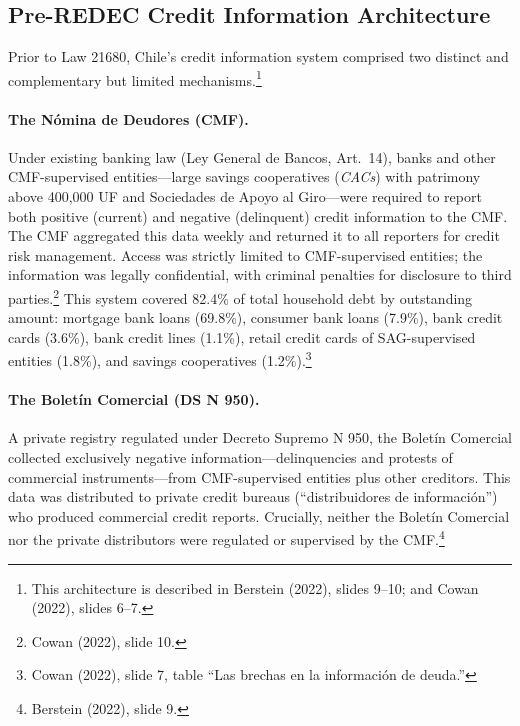 \documentclass[12pt]{article}
\theoremstyle{plain}
\theoremstyle{plain}
\begin{document}
\subsection{Pre-REDEC Credit Information Architecture}

Prior to Law 21680, Chile's credit information system comprised two distinct and complementary but limited mechanisms.\footnote{This architecture is described in Berstein (2022), slides 9--10; and Cowan (2022), slides 6--7.}

\paragraph{The N\'omina de Deudores (CMF).} Under existing banking law (Ley General de Bancos, Art.\ 14), banks and other CMF-supervised entities—large savings cooperatives (\textit{CACs}) with patrimony above 400,000 UF and Sociedades de Apoyo al Giro—were required to report both positive (current) and negative (delinquent) credit information to the CMF. The CMF aggregated this data weekly and returned it to all reporters for credit risk management. Access was strictly limited to CMF-supervised entities; the information was legally confidential, with criminal penalties for disclosure to third parties.\footnote{Cowan (2022), slide 10.} This system covered 82.4\% of total household debt by outstanding amount: mortgage bank loans (69.8\%), consumer bank loans (7.9\%), bank credit cards (3.6\%), bank credit lines (1.1\%), retail credit cards of SAG-supervised entities (1.8\%), and savings cooperatives (1.2\%).\footnote{Cowan (2022), slide 7, table ``Las brechas en la informaci\'on de deuda.''}

\paragraph{The Bolet\'in Comercial (DS N\textdegree{} 950).} A private registry regulated under Decreto Supremo N\textdegree{} 950, the Bolet\'in Comercial collected exclusively negative information—delinquencies and protests of commercial instruments—from CMF-supervised entities plus other creditors. This data was distributed to private credit bureaus (``distribuidores de informaci\'on'') who produced commercial credit reports. Crucially, neither the Bolet\'in Comercial nor the private distributors were regulated or supervised by the CMF.\footnote{Berstein (2022), slide 9.}
\end{document}
